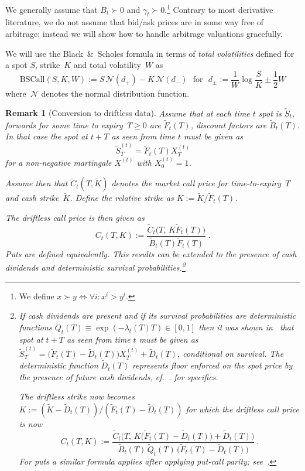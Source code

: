 \documentclass[11pt,a4paper]{article}
\newtheorem{remark}[definition]{Remark}
\newcommand{\BSCall}{\mathrm{BSCall}}
\begin{document}
We generally assume that $B_t\succ0$ and $\gamma_t\succ0$.\footnote{
We define $x \succ y \Leftrightarrow \forall i: x^i > y^i$.}
Contrary to most derivative literature, we do not assume that bid/ask prices are in some way free of arbitrage; instead
we will show how to handle arbitrage valuations gracefully.

We will use the Black~\&~Scholes formula in terms of \emph{total volatilities} defined 
for a spot $S$, strike~$K$ and total volatility~$W$ as
\begin{equation}\label{eq:bs}
    \BSCall(S,K,W) := S\,\mathcal{N}( d_+ ) - K\,\mathcal{N}(d_-)
    \ \ \ \mbox{for} \ \ \
    d_\pm := \frac{ 1 }{ W } \log \frac S K \pm \frac12 W
\end{equation}
where~$\mathcal{N}$ denotes the normal distribution function.

\begin{remark}[Conversion to driftless data]\label{rem:driftless}
  Assume that at each time $t$ spot is $\tilde S_t$, forwards for some time to expiry~$T\geq 0$ are $\tilde F_t(T)$, discount factors are $\tilde B_t(T)$.
  In  that case the spot at $t+T$ as seen from time $t$ must be given as
  $$
  \tilde S_T^{(t)}= \tilde F_t(T)X_T^{(t)} 
  $$
  for a non-negative martingale $X^{(t)}$ with $X^{(t)}_0=1$. 

  Assume then that $\tilde C_t( T,\tilde{K})$ denotes the market call price for time-to-expiry~$T$ and cash strike~$\tilde K$. 
  Define the relative strike as
  $
  K :=\tilde K / \tilde F_t(  T) 
  $.

  The driftless call price is then given as
  $$
    C_t( T,K) := \frac{\tilde{C}_t\Big( T,\, K \tilde F_t(T) \Big)}{\tilde B_t(T) \tilde F_t(T) } \ .
  $$ 
  Puts are defined equivalently.
  This results can  be extended to the presence of cash dividends and deterministic survival probabilities.\footnote{
    If cash dividends 
    are present and if its survival probabilities are deterministic functions $\tilde Q_t(T)\equiv \exp( - \lambda_t(T)T )\in [0,1]$ then it was shown in~\citet{BuehlerVolAndDivs}
    that spot at $t+T$ as seen from time $t$ must be given as $\tilde S_T^{(t)}=\big(\tilde F_t(T)-\tilde D_t(T)\big) X_T^{(t)} + \tilde D_t(T)$, conditional on survival.
    The deterministic function $\tilde D_t(T)$ represents floor enforced on the spot price by the presence of future cash dividends, cf.~\citet{BuehlerVolAndDivs}.
    for specifics.

    The driftless strike now becomes 
    $
    K := (\tilde K - \tilde D_t( T) ) / ( \tilde F_t(  T) - \tilde D_t(T) )
    $
    for which the driftless call price is now
    $$
      C_t( T,K) := \frac{\tilde{C}_t\Big( T,\, K\big(\tilde F_t(T)-\tilde D_t(T)\big) + \tilde D_t(T)\Big)}{\tilde B_t(T) \, \tilde Q_t(T)\,\big(\tilde F_t(T)-\tilde D_t(T)\big)} \ .
    $$
    For puts a similar formula applies after applying put-call parity; see~\citet{BuehlerVolAndDivs}.}
\end{remark}
\end{document}
